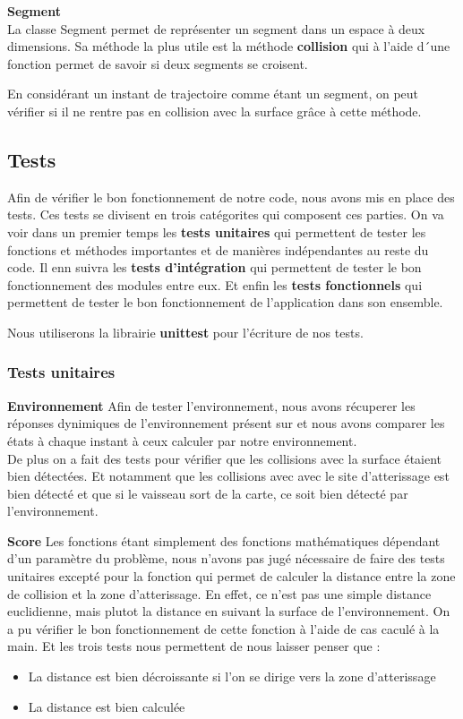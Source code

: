 \documentclass[french,a4paper,10pt,twocolumn]{article}
\begin{document}
\textbf{Segment}\\
La classe Segment permet de représenter un segment dans un espace à deux dimensions.
Sa méthode la plus utile est la méthode \textbf{collision} qui à l'aide d´une fonction \cite[CCW]{ccw_intersect_detection} permet de savoir si deux segments se croisent.

En considérant un instant de trajectoire comme étant un segment, on peut vérifier si il ne rentre pas en collision avec la surface grâce à cette méthode.

\subsection{Tests}

Afin de vérifier le bon fonctionnement de notre code, nous avons mis en place des tests.
Ces tests se divisent en trois catégorites qui composent ces parties.
On va voir dans un premier temps les \textbf{tests unitaires} qui permettent de tester les fonctions et méthodes importantes et de manières indépendantes
au reste du code.
Il enn suivra les \textbf{tests d'intégration} qui permettent de tester le bon fonctionnement des modules entre eux.
Et enfin les \textbf{tests fonctionnels} qui permettent de tester le bon fonctionnement de l'application dans son ensemble.

Nous utiliserons la librairie \textbf{unittest} pour l'écriture de nos tests.

\subsubsection{Tests unitaires}

\textbf{Environnement}
Afin de tester l'environnement, nous avons récuperer les réponses dynimiques de l'environnement présent sur \cite[CodinGame]{codingame_mars_lander} 
et nous avons comparer les états à chaque instant à ceux calculer par notre environnement.\\
De plus on a fait des tests pour vérifier que les collisions avec la surface étaient bien détectées. 
Et notamment que les collisions avec avec le site d'atterissage est bien détecté et que si le vaisseau 
sort de la carte, ce soit bien détecté par l'environnement.


\textbf{Score}
Les fonctions étant simplement des fonctions mathématiques dépendant d'un paramètre du problème, nous n'avons pas jugé nécessaire de faire des tests unitaires
excepté pour la fonction qui permet de calculer la distance entre la zone de collision et la zone d'atterissage.
En effet, ce n'est pas une simple distance euclidienne, mais plutot la distance en suivant la surface de l'environnement.
On a pu vérifier le bon fonctionnement de cette fonction à l'aide de cas caculé à la main.
Et les trois tests nous permettent de nous laisser penser que :
\begin{itemize}
    \item La distance est bien décroissante si l'on se dirige vers la zone d'atterissage
    \item La distance est bien calculée
\end{itemize}
\end{document}
